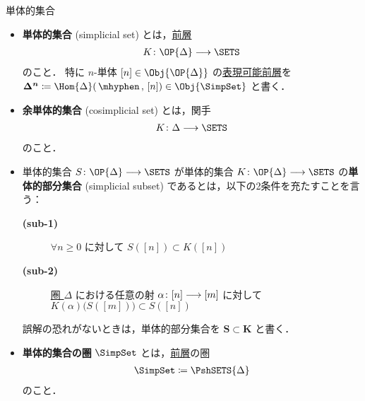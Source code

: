 \documentclass[TQFT_main]{subfiles}
\begin{document}
\begin{mydef}[label=def:SimpSet,breakable]{単体的集合}
    \begin{itemize}
        \item \textbf{単体的集合} (simplicial set)  とは，\hyperref[def:presheaf-general]{前層}
        \begin{align}
            K \colon \OP{\Delta} \lto \SETS
        \end{align}
        のこと．
        特に $n$-単体 $[n] \in \Obj{\OP{\Delta}}$ の\hyperref[def:representable]{表現可能前層}を $\bm{\Delta^n} \coloneqq \Hom{\Delta} (\, \mhyphen \,,\, [n]) \in \Obj{\SimpSet}$ と書く．

        \item \textbf{余単体的集合} (cosimplicial set) とは，関手
        \begin{align}
            K \colon \Delta \lto \SETS
        \end{align}
        のこと．
        \item 単体的集合 $S \colon \OP{\Delta} \lto \SETS$ が単体的集合 $K \colon \OP{\Delta} \lto \SETS$ の\textbf{単体的部分集合} (simplicial subset) であるとは，以下の2条件を充たすことを言う：
        \begin{description}
            \item[\textbf{(sub-1)}] $\forall n \ge 0$ に対して $S([n]) \subset K([n])$
            \item[\textbf{(sub-2)}] \hyperref[def:simplex-cat]{圏 $\Delta$} における任意の射 $\alpha \colon [n] \longrightarrow [m]$ に対して $K(\alpha) \bigl( S([m]) \bigr) \subset S([n])$
        \end{description}
        誤解の恐れがないときは，単体的部分集合を $\bm{S \subset K}$ と書く．
        \item \textbf{単体的集合の圏} $\SimpSet$ とは，\hyperref[def:presheaf-general]{前層}の圏
        \begin{align}
            \SimpSet \coloneqq \PshSETS{\Delta}
        \end{align}
        のこと．
    \end{itemize}

    \tcblower


\end{mydef}
\end{document}
